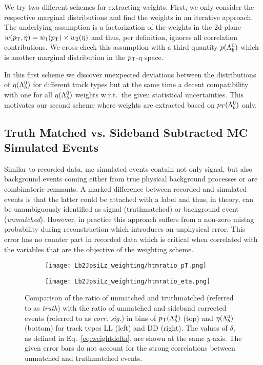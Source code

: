 We try two different schemes for extracting weights.
First, we only consider the respective marginal distributions and find the weights in an iterative approach.
The underlying assumption is a factorization of the weights in the 2d-plane $w(\mbox{$p_{\mathrm{ T}}$}, \eta) = w_1(\mbox{$p_{\mathrm{ T}}$}) \times w_2(\eta)$ and thus, per definition, ignores all correlation contributions.
We cross-check this assumption with a third quantity $p({{\Lambda}^0_{b}})$ which is another marginal distribution in the $\mbox{$p_{\mathrm{ T}}$}$-$\eta$ space.

In this first scheme we discover unexpected deviations between the distributions of $\eta({{\Lambda}^0_{b}})$ for different track types but at the same time a decent compatibility with one for all $\eta({{\Lambda}^0_{b}})$ weights w.r.t.\ the given statistical uncertainties.
This motivates our second scheme where weights are extracted based on $\mbox{$p_{\mathrm{ T}}$}({{\Lambda}^0_{b}})$ only.

\subsection{Truth Matched vs. Sideband Subtracted MC Simulated Events}
\label{sec:LbToJpsiLz_tm_vs_ss}

Similar to recorded data, \gls{mc} simulated events contain not only signal, but also background events coming either from true physical background processes or are combinatoric remnants.
A marked difference between recorded and simulated events is that the latter could be attached with a label and thus, in theory, can be unambiguously identified as signal (\gls{truthmatched}) or background event (\textit{unmatched}).
However, in practice this approach suffers from a non-zero mistag probability during reconstruction which introduces an unphysical error.
This error has no counter part in recorded data which is critical when correlated with the variables that are the objective of the weighting scheme.

\begin{figure}[htbp]
    \centering
    \begin{subfigure}{\textwidth}
        \centering
        \texttt{[image: Lb2JpsiLz\_weighting/htmratio\_pT.png]}
    \end{subfigure}
    \par\bigskip 
    \begin{subfigure}{\textwidth}
        \centering
        \texttt{[image: Lb2JpsiLz\_weighting/htmratio\_eta.png]}
    \end{subfigure}
    \caption{Comparison of the ratio of unmatched and \gls{truthmatched} (referred to as \textit{truth}) with the ratio of unmatched and sideband corrected events (referred to as \textit{corr. sig.}) in bins of $\mbox{$p_{\mathrm{ T}}$}({{\Lambda}^0_{b}})$ (top) and $\eta({{\Lambda}^0_{b}})$ (bottom) for track types \gls{LL} (left) and \gls{DD} (right). The values of $\delta$, as defined in Eq.~\eqref{eq:weightdelta}, are shown at the same $y$-axis. The given error bars do not account for the strong correlations between unmatched and \gls{truthmatched} events.}
    \label{fig:htmratio_LbToJpsiLz}
\end{figure}

